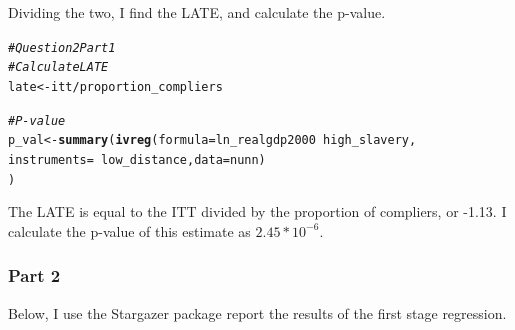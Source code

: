 \documentclass{article}\usepackage[]{graphicx}\usepackage[]{color}
\makeatletter
\newcommand{\hlcom}[1]{\textcolor[rgb]{0.678,0.584,0.686}{\textit{#1}}}%
\newcommand{\hlopt}[1]{\textcolor[rgb]{0,0,0}{#1}}%
\newcommand{\hlstd}[1]{\textcolor[rgb]{0.345,0.345,0.345}{#1}}%
\newcommand{\hlkwb}[1]{\textcolor[rgb]{0.69,0.353,0.396}{#1}}%
\newcommand{\hlkwc}[1]{\textcolor[rgb]{0.333,0.667,0.333}{#1}}%
\newcommand{\hlkwd}[1]{\textcolor[rgb]{0.737,0.353,0.396}{\textbf{#1}}}%
\newenvironment{kframe}{%
 \def\at@end@of@kframe{}%
 \ifinner\ifhmode%
  \def\at@end@of@kframe{\end{minipage}}%
  \begin{minipage}{\columnwidth}%
 \fi\fi%
 \def\FrameCommand##1{\hskip\@totalleftmargin \hskip-\fboxsep
 \colorbox{shadecolor}{##1}\hskip-\fboxsep
     \hskip-\linewidth \hskip-\@totalleftmargin \hskip\columnwidth}%
 \MakeFramed {\advance\hsize-\width
   \@totalleftmargin\z@ \linewidth\hsize
   \@setminipage}}%
 {\par\unskip\endMakeFramed%
 \at@end@of@kframe}
\newenvironment{knitrout}{}{} %
\makeatother
\begin{document}
Dividing the two, I find the LATE, and calculate the p-value.
\begin{knitrout}
\color{fgcolor}\begin{kframe}
\begin{alltt}
\hlcom{#Question 2 Part 1}
\hlcom{#Calculate LATE}
\hlstd{late} \hlkwb{<-} \hlstd{itt} \hlopt{/} \hlstd{proportion_compliers}

\hlcom{# P-value}
\hlstd{p_val} \hlkwb{<-} \hlkwd{summary}\hlstd{(}\hlkwd{ivreg}\hlstd{(}\hlkwc{formula} \hlstd{= ln_realgdp2000} \hlopt{~} \hlstd{high_slavery,}
                   \hlkwc{instruments} \hlstd{=} \hlopt{~} \hlstd{low_distance,} \hlkwc{data} \hlstd{= nunn)}
                                \hlstd{)}
\end{alltt}
\end{kframe}
\end{knitrout}

The LATE is equal to the ITT divided by the proportion of compliers, or -1.13.
I calculate the p-value of this estimate as $2.45*10^{-6}$.

\subsubsection{Part 2}
Below, I use the Stargazer package \parencite[][]{Stargazer} report the results of the first stage regression.
\end{document}
